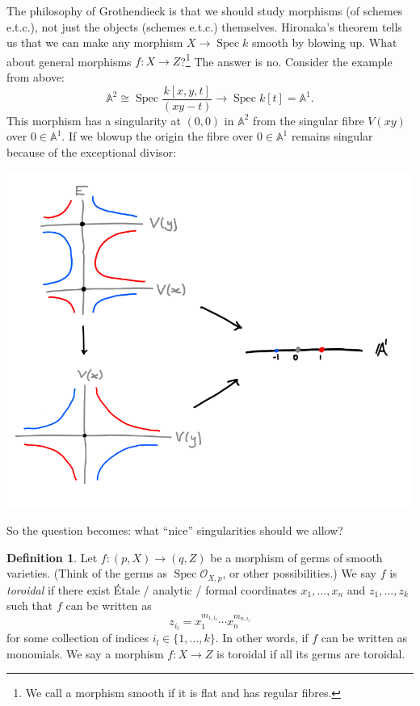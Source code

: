 \documentclass{article}
\theoremstyle{definition}
\newtheorem*{definition}{Definition}
\DeclareMathOperator{\Spec}{Spec}
\renewcommand{\O}{\mathcal{O}}
\newcommand{\A}{\mathbb{A}}
\begin{document}
The philosophy of Grothendieck is that we should study morphisms (of schemes
e.t.c.), not just the objects (schemes e.t.c.) themselves. Hironaka's theorem
tells us that we can make any morphism $X\to\Spec k$ smooth by blowing up. What
about general morphisms $f:X\to Z$?\footnote{We call a morphism smooth if it is
flat and has regular fibres.} The answer is no. Consider the example from above:
\begin{equation*}
    \A^2 \cong \Spec\frac{k[x,y,t]}{(xy-t)} \to \Spec k[t] = \A^1.
\end{equation*}
This morphism has a singularity at $(0,0)$ in $\A^2$ from the singular fibre
$V(xy)$ over $0\in\A^1$. If we blowup the origin the fibre over $0\in\A^1$
remains singular because of the exceptional divisor:
\begin{center}
    \includegraphics[scale=0.4]{hyperbola_blowup}
\end{center}
So the question becomes: what ``nice'' singularities should we allow?

\begin{definition}
    Let $f:(p,X)\to(q,Z)$ be a morphism of germs of smooth varieties. (Think of
    the germs as $\Spec\O_{X,p}$, or other possibilities.) We say $f$ is
    \emph{toroidal} if there exist \'Etale / analytic / formal coordinates
    $x_1,\ldots,x_n$ and $z_1,\ldots,z_k$ such that $f$ can be written as
    \begin{equation*}
        z_{i_l} = x_1^{m_{1,i_l}}\cdots x_n^{m_{n,i_l}}
    \end{equation*}
    for some collection of indices $i_l\in\{1,\ldots,k\}$. In other words, if
    $f$ can be written as monomials. We say a morphism $f:X\to Z$ is toroidal if
    all its germs are toroidal.
\end{definition}
\end{document}
